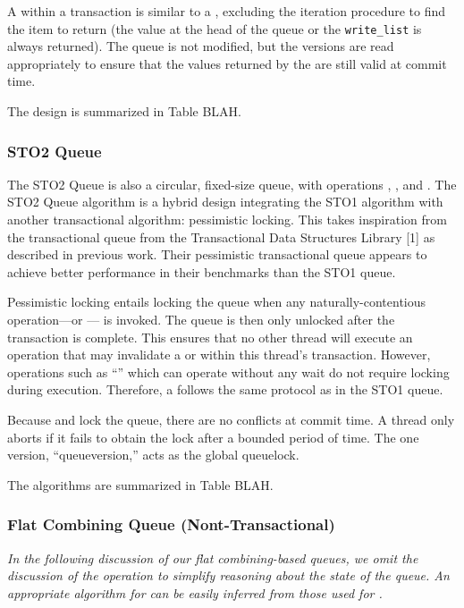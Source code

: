 A \front within a transaction is similar to a \pop, excluding the iteration procedure to find the item to return (the value at the head of the queue or the \texttt{write\_list} is always returned). The queue is not modified, but the versions are read appropriately to ensure that the values returned by the \front are still valid at commit time.

The design is summarized in Table BLAH.

\subsubsection{STO2 Queue}
The STO2 Queue is also a circular, fixed-size queue, with operations \push, \pop, and \front. The STO2 Queue algorithm is a hybrid design integrating the STO1 algorithm with another transactional algorithm: pessimistic locking. This takes inspiration from the transactional queue from the Transactional Data Structures Library [1] as described in previous work. Their pessimistic transactional queue appears to achieve better performance in their benchmarks than the STO1 queue. 

Pessimistic locking entails locking the queue when any naturally-contentious operation---\pop or \front--- is invoked. The queue is then only unlocked after the transaction is complete. This ensures that no other thread will execute an operation that may invalidate a \pop or \front within this thread’s transaction. However, operations such as “\push” which can operate without any wait do not require locking during execution. Therefore, a \push follows the same protocol as in the STO1 queue.

Because \pop and \front lock the queue, there are no conflicts at commit time. A thread only aborts if it fails to obtain the lock after a bounded period of time. The one version, “queueversion,” acts as the global queuelock. 

The algorithms are summarized in Table BLAH.

\subsubsection{Flat Combining Queue (Nont-Transactional)}

\emph{In the following discussion of our flat combining-based queues, we omit the discussion of the \front operation to simplify reasoning about the state of the queue. An appropriate algorithm for \front can be easily inferred from those used for \pop.}

